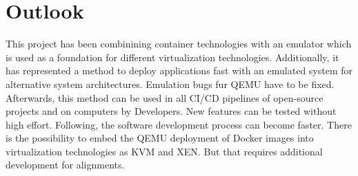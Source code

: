 \chapter{Outlook}\label{ch:outlook}

This project has been combinining container technologies with an emulator which is used as a foundation for different virtualization technologies. 
Additionally, it has represented a method to deploy applications fast with an emulated system for alternative system architectures.
Emulation bugs fur QEMU have to be fixed. Afterwards, this method can be used in all CI/CD pipelines of open-source projects and on computers by Developers.
New features can be tested without high effort. Following, the software development process can become faster.
There is the possibility to embed the QEMU deployment of Docker images into virtualization technologies as KVM and XEN.
But that requires additional development for alignments.